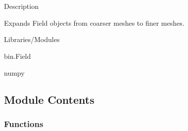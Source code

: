 \documentclass[letterpaper,10pt,english]{sphinxmanual}
\begin{document}
\begin{fulllineitems}
\begin{fulllineitems}
\begin{quote}
\begin{description}
\end{description}\end{quote}

\end{fulllineitems}


\begin{fulllineitems}
\label{\detokenize{autoapi/Cycle/index:Cycle.Cycle.path}}
\end{fulllineitems}


\begin{fulllineitems}
\label{\detokenize{autoapi/Cycle/index:Cycle.Cycle.depth}}
\end{fulllineitems}


\end{fulllineitems}



\section{}
\label{\detokenize{autoapi/Expandinator/index:module-Expandinator}}\label{\detokenize{autoapi/Expandinator/index:expandinator}}\label{\detokenize{autoapi/Expandinator/index::doc}}
\sphinxAtStartPar
Description

\sphinxAtStartPar
Expands Field objects from coarser meshes to finer meshes.

\sphinxAtStartPar
Libraries/Modules

\sphinxAtStartPar
bin.Field

\sphinxAtStartPar
numpy


\subsection{Module Contents}
\label{\detokenize{autoapi/Expandinator/index:module-contents}}

\subsubsection{Functions}
\label{\detokenize{autoapi/Expandinator/index:functions}}
\end{document}
